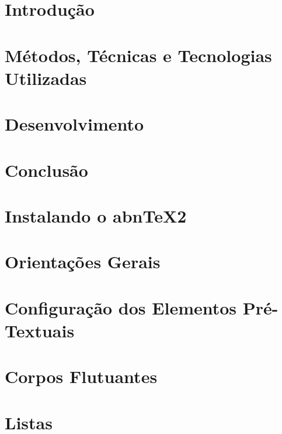 \documentclass[brazil]{packages/icmc}
\begin{document}
\textual

\chapter{Introdução}
\label{chapter:introducao}


\chapter{Métodos, Técnicas e Tecnologias Utilizadas}
\label{chapter:metodos}


\chapter{Desenvolvimento}
\label{chapter:desenvolvimento}


\chapter{Conclusão}
\label{chapter:conclusao}


\chapter{Instalando o abnTeX2}
\label{chapter:instalando-abntex}


\chapter{Orientações Gerais}
\label{chapter:orientacoes-gerais}


\chapter{Configuração dos Elementos Pré-Textuais}
\label{chapter:config-pre-textual}


\chapter{Corpos Flutuantes}
\label{chapter:corpos-flutuantes}


\chapter{Listas}
\label{chapter:listas}

\end{document}
